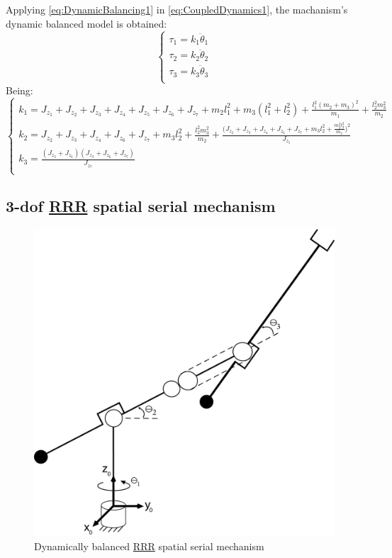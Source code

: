 \documentclass[a4paper,11pt,brazil,fleqn]{article}
\begin{document}
Applying \eqref{eq:DynamicBalancing1} in \eqref{eq:CoupledDynamics1}, the machanism's dynamic balanced model is obtained: 
\begin{equation}\label{eq:DynamicBalanced1}
\begin{cases}
\tau_1 = k_1 \ddot{\theta}_1 \\
\tau_2 = k_2 \ddot{\theta}_2 \\
\tau_3 = k_3 \ddot{\theta}_3 \\
\end{cases}
\end{equation}
Being:
\begin{equation}\label{eq:DynamicBalancedKs1}
\begin{cases}
k_1 = J_{z_1} + J_{z_2} + J_{z_3} + J_{z_4} + J_{z_5} + J_{z_6} + J_{z_7} + m_2 l_1^2 + m_3 (l_1^2 + l_2^2) + \frac{l_1^2 (m_2 + m_3)^2}{m_1} + \frac{l_2^2 m_3^2}{m_2} \\
k_2 = J_{z_2} + J_{z_3} + J_{z_4} + J_{z_6} + J_{z_7} + m_3 l_2^2 + \frac{l_2^2 m_3^2}{m_2} + \frac{\big(J_{z_2} + J_{z_3} + J_{z_4} + J_{z_6} + J_{z_7} + m_3 l_2^2 + \frac{m_3^2 l_2^2}{m_2}\big)^2}{J_{z_5}} \\
k_3 = \frac{(J_{z_3}+J_{z_6})(J_{z_3}+J_{z_6}+J_{z_7})}{J_{z_7}} \\
\end{cases}
\end{equation}

\subsection{3-dof \underline{RRR} spatial serial mechanism} \label{S03-2}

\begin{figure}[H]
	\centering
	\includegraphics[scale=0.11]{RRR3D.jpg}  
	\caption{Dynamically balanced \underline{RRR} spatial serial mechanism}
	\label{fig:RRR3D}
\end{figure}
\end{document}
